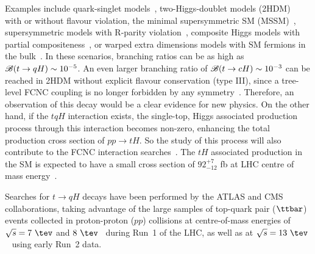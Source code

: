 Examples include quark-singlet models~\cite{AguilarSaavedra:2002kr}, two-Higgs-doublet models (2HDM)~\cite{Branco:2hdm2012} with or without flavour violation,
the minimal supersymmetric SM (MSSM)~\cite{Bejar:2000ub, Guasch:1999jp,Cao:2007dk,Cao:2014udj},
supersymmetric models with R-parity violation~\cite{Eilam:2001dh}, composite Higgs models with partial compositeness~\cite{Azatov:2014lha}, 
or warped extra dimensions models with SM fermions in the bulk~\cite{Azatov:2009na}. 
In these scenarios, branching ratios can be as high as $\mathscr{B}(t\to qH) \sim 10^{-5}$. 
An even larger branching ratio of  $\mathscr{B}(t\to cH) \sim 10^{-3}$ can be reached in 2HDM without explicit flavour conservation (type III),
since a tree-level FCNC coupling is no longer forbidden by any symmetry~\cite{Cheng:1987rs,Baum:2008qm,Chen:2013qta,Chiang:2015cba,Crivellin:2015hha,Botella:2015hoa, Gori:2017tvg,Chiang:2017fjr}. 
Therefore, an observation of this decay would be a clear evidence for new physics.
On the other hand, if the $tqH$ interaction exists, the single-top, Higgs associated production process through this interaction becomes non-zero, enhancing the total
production cross section of $pp\rightarrow tH$.
So the study of this process will also contribute to the FCNC interaction searches~\cite{Greljo:2014dka}.
The $tH$ associated production in the SM is expected to have a small cross section of $92^{+7}_{-12}$ fb at LHC centre of mass energy~\cite{deFlorian:2016spz}.

Searches for $t \to qH$ decays have been performed by the ATLAS and CMS collaborations, taking advantage of the large samples
of top-quark pair ($\ttbar$) events collected in proton-proton ($pp$) collisions at centre-of-mass energies of $\sqrt{s}=7~\tev$ and $8~\tev$~\cite{Aad:2014dya,Aad:2015pja,Khachatryan:2016atv} during Run~1 of the LHC, as well as at $\sqrt{s}=13~\tev$~\cite{fcnc36} using early Run~2 data.

